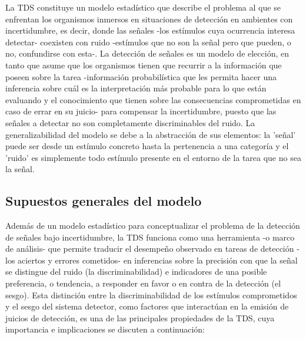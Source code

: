 La TDS constituye un modelo estadístico que describe el problema al que se enfrentan los organismos inmersos en situaciones de detección en ambientes con incertidumbre, es decir, donde las señales -los estímulos cuya ocurrencia interesa detectar- coexisten con ruido -estímulos que no son la señal pero que pueden, o no, confundirse con esta-. La detección de señales es un modelo de elección, en tanto que asume que los organismos tienen que recurrir a la información que poseen sobre la tarea -información probabilística que les permita hacer una inferencia sobre cuál es la interpretación más probable para lo que están evaluando y el conocimiento que tienen sobre las consecuencias comprometidas en caso de errar en su juicio- para compensar la incertidumbre, puesto que las señales a detectar no son completamente discriminables del ruido. La generalizabilidad del modelo se debe a la abstracción de sus elementos: la 'señal' puede ser desde un estímulo concreto hasta la pertenencia a una categoría y el 'ruido' es simplemente todo estímulo presente en el entorno de la tarea que no sea la señal.\\ 

\subsection{Supuestos generales del modelo}

Además de un modelo estadístico para conceptualizar el problema de la detección de señales bajo incertidumbre, la TDS funciona como una herramienta -o marco de análisis- que permite traducir el desempeño observado en tareas de detección -los aciertos y errores cometidos- en inferencias sobre la precisión con que la señal se distingue del ruido (la discriminabilidad) e indicadores de una posible preferencia, o tendencia, a responder en favor o en contra de la detección (el sesgo). Esta distinción entre la discriminabilidad de los estímulos comprometidos y el sesgo del sistema detector, como factores que interactúan en la emisión de juicios de detección, es una de las principales propiedades de la TDS, cuya importancia e implicaciones se discuten a continuación:\\


